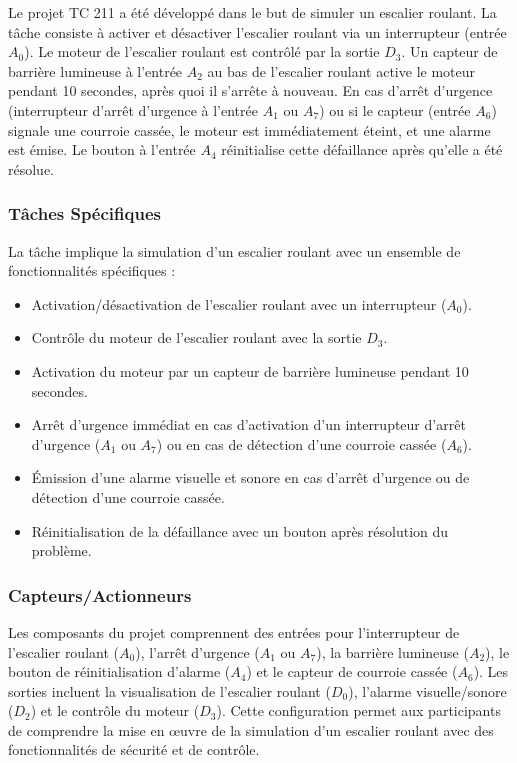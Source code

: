 \documentclass[a4paper,12pt]{report}
\begin{document}
Le projet TC 211 a été développé dans le but de simuler un escalier roulant. La tâche consiste à activer et désactiver l'escalier roulant via un interrupteur (entrée \(A_0\)). Le moteur de l'escalier roulant est contrôlé par la sortie \(D_3\). Un capteur de barrière lumineuse à l'entrée \(A_2\) au bas de l'escalier roulant active le moteur pendant 10 secondes, après quoi il s'arrête à nouveau. En cas d'arrêt d'urgence (interrupteur d'arrêt d'urgence à l'entrée \(A_1\) ou \(A_7\)) ou si le capteur (entrée \(A_6\)) signale une courroie cassée, le moteur est immédiatement éteint, et une alarme est émise. Le bouton à l'entrée \(A_4\) réinitialise cette défaillance après qu'elle a été résolue.

\subsubsection{Tâches Spécifiques}

La tâche implique la simulation d'un escalier roulant avec un ensemble de fonctionnalités spécifiques :
\begin{itemize}
    \item Activation/désactivation de l'escalier roulant avec un interrupteur (\(A_0\)).
    \item Contrôle du moteur de l'escalier roulant avec la sortie \(D_3\).
    \item Activation du moteur par un capteur de barrière lumineuse pendant 10 secondes.
    \item Arrêt d'urgence immédiat en cas d'activation d'un interrupteur d'arrêt d'urgence (\(A_1\) ou \(A_7\)) ou en cas de détection d'une courroie cassée (\(A_6\)).
    \item Émission d'une alarme visuelle et sonore en cas d'arrêt d'urgence ou de détection d'une courroie cassée.
    \item Réinitialisation de la défaillance avec un bouton après résolution du problème.
\end{itemize}

\subsubsection{Capteurs/Actionneurs}

Les composants du projet comprennent des entrées pour l'interrupteur de l'escalier roulant (\(A_0\)), l'arrêt d'urgence (\(A_1\) ou \(A_7\)), la barrière lumineuse (\(A_2\)), le bouton de réinitialisation d'alarme (\(A_4\)) et le capteur de courroie cassée (\(A_6\)). Les sorties incluent la visualisation de l'escalier roulant (\(D_0\)), l'alarme visuelle/sonore (\(D_2\)) et le contrôle du moteur (\(D_3\)). Cette configuration permet aux participants de comprendre la mise en œuvre de la simulation d'un escalier roulant avec des fonctionnalités de sécurité et de contrôle.
\end{document}
